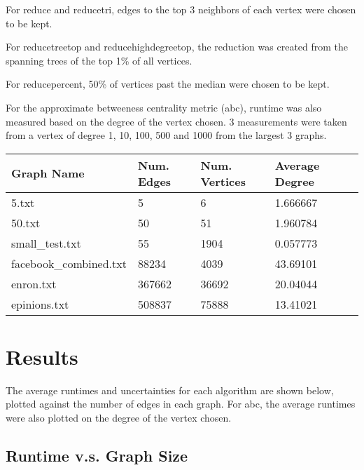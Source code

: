 \documentclass[12pt]{article}
\begin{document}
For reduce and reducetri, edges to the top 3 neighbors of each vertex were chosen to be kept.

For reducetreetop and reducehighdegreetop, the reduction was created from the spanning trees of the top 1\% of all vertices.

For reducepercent, 50\% of vertices past the median were chosen to be kept.

For the approximate betweeness centrality metric (abc), runtime was also measured based on the degree of the vertex chosen. 3 measurements were taken from a vertex of degree 1, 10, 100, 500 and 1000 from the largest 3 graphs.

\begin{tabular}{|l|l|l|l|l}
\cline{1-4}
\hline
Graph Name          & Num. Edges  & Num. Vertices & Average Degree \\
\hline
5.txt                  & 5      & 6        & 1.666667        \\
\hline
50.txt                 & 50     & 51       & 1.960784        \\
\hline
small\_test.txt        & 55     & 1904     & 0.057773        \\
\hline
facebook\_combined.txt & 88234  & 4039     & 43.69101        \\
\hline
enron.txt              & 367662 & 36692    & 20.04044        \\
\hline
epinions.txt           & 508837 & 75888    & 13.41021        \\
\hline
\end{tabular}


\section{Results}

The average runtimes and uncertainties for each algorithm are shown below, plotted against the number of edges in each graph. For abc, the average runtimes were also plotted on the degree of the vertex chosen.

\subsection{Runtime v.s. Graph Size}
\end{document}
